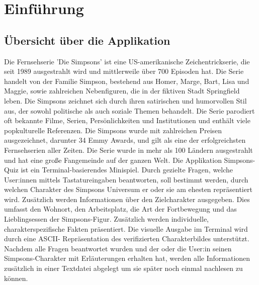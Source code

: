 \chapter{Einführung}

\section{Übersicht über die Applikation}
Die Fernsehserie 'Die Simpsons' ist eine US-amerikanische Zeichentrickserie, die seit 1989 ausgestrahlt wird und mittlerweile über 700 Episoden hat. Die Serie handelt von der Familie Simpson, bestehend aus Homer, Marge, Bart, Lisa und Maggie, sowie zahlreichen Nebenfiguren, die in der fiktiven Stadt Springfield leben. Die Simpsons zeichnet sich durch ihren satirischen und humorvollen Stil aus, der sowohl politische als auch soziale Themen behandelt. Die Serie parodiert oft bekannte Filme, Serien, Persönlichkeiten und Institutionen und enthält viele popkulturelle Referenzen. Die Simpsons wurde mit zahlreichen Preisen ausgezeichnet, darunter 34 Emmy Awards, und gilt als eine der erfolgreichsten Fernsehserien aller Zeiten. Die Serie wurde in mehr als 100 Ländern ausgestrahlt und hat eine große Fangemeinde auf der ganzen Welt.\cite{simpsons.2023}
\newline
Die Applikation Simpsons-Quiz ist ein Terminal-basierendes Minispiel. Durch gezielte Fragen, welche User:innen mittels Tastatureingaben beantworten, soll bestimmt werden, durch welchen Charakter des Simpsons Universum er oder sie am ehesten repräsentiert wird. Zusätzlich werden Informationen über den Zielcharakter ausgegeben. Dies umfasst den Wohnort, den Arbeitsplatz, die Art der Fortbewegung und das Lieblingsessen der Simpsons-Figur. Zusätzlich werden individuelle, charakterspezifische Fakten präsentiert. \newline
Die visuelle Ausgabe im Terminal wird durch eine \ac{ASCII}- Repräsentation des verifizierten Charakterbildes unterstützt. Nachdem alle Fragen beantwortet wurden und der oder die User:in seinen Simpsons-Charakter mit Erläuterungen erhalten hat, werden alle Informationen zusätzlich in einer Textdatei abgelegt um sie später noch einmal nachlesen zu können.
\newpage
